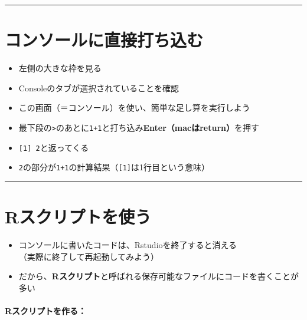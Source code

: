 \documentclass[
]{book}
\providecommand{\tightlist}{%
  \setlength{\itemsep}{0pt}\setlength{\parskip}{0pt}}
\begin{document}
\begin{center}\rule{0.5\linewidth}{0.5pt}\end{center}

\hypertarget{ux30b3ux30f3ux30bdux30fcux30ebux306bux76f4ux63a5ux6253ux3061ux8fbcux3080}{%
\section{コンソールに直接打ち込む}\label{ux30b3ux30f3ux30bdux30fcux30ebux306bux76f4ux63a5ux6253ux3061ux8fbcux3080}}

\begin{itemize}
\tightlist
\item
  左側の大きな枠を見る\\
\item
  Consoleのタブが選択されていることを確認
\item
  この画面（＝コンソール）を使い、簡単な足し算を実行しよう
\item
  最下段の\texttt{\textgreater{}}のあとに\texttt{1+1}と打ち込み\textbf{Enter（macはreturn）}を押す
\item
  \texttt{{[}1{]}\ 2}と返ってくる
\item
  \texttt{2}の部分が\texttt{1+1}の計算結果（\texttt{{[}1{]}}は1行目という意味）
\end{itemize}

\begin{center}\rule{0.5\linewidth}{0.5pt}\end{center}

\hypertarget{rux30b9ux30afux30eaux30d7ux30c8ux3092ux4f7fux3046}{%
\section{Rスクリプトを使う}\label{rux30b9ux30afux30eaux30d7ux30c8ux3092ux4f7fux3046}}

\begin{itemize}
\tightlist
\item
  コンソールに書いたコードは、Rstudioを終了すると消える\\
  （実際に終了して再起動してみよう）\\
\item
  だから、\textbf{Rスクリプト}と呼ばれる保存可能なファイルにコードを書くことが多い
\end{itemize}

\hypertarget{rux30b9ux30afux30eaux30d7ux30c8ux3092ux4f5cux308b}{%
\paragraph*{Rスクリプトを作る：}\label{rux30b9ux30afux30eaux30d7ux30c8ux3092ux4f5cux308b}}
\end{document}
